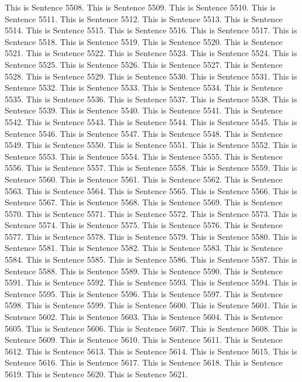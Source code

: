 \documentclass{article}
\begin{document}
This is Sentence 5508.
This is Sentence 5509.
This is Sentence 5510.
This is Sentence 5511.
This is Sentence 5512.
This is Sentence 5513.
This is Sentence 5514.
This is Sentence 5515.
This is Sentence 5516.
This is Sentence 5517.
This is Sentence 5518.
This is Sentence 5519.
This is Sentence 5520.
This is Sentence 5521.
This is Sentence 5522.
This is Sentence 5523.
This is Sentence 5524.
This is Sentence 5525.
This is Sentence 5526.
This is Sentence 5527.
This is Sentence 5528.
This is Sentence 5529.
This is Sentence 5530.
This is Sentence 5531.
This is Sentence 5532.
This is Sentence 5533.
This is Sentence 5534.
This is Sentence 5535.
This is Sentence 5536.
This is Sentence 5537.
This is Sentence 5538.
This is Sentence 5539.
This is Sentence 5540.
This is Sentence 5541.
This is Sentence 5542.
This is Sentence 5543.
This is Sentence 5544.
This is Sentence 5545.
This is Sentence 5546.
This is Sentence 5547.
This is Sentence 5548.
This is Sentence 5549.
This is Sentence 5550.
This is Sentence 5551.
This is Sentence 5552.
This is Sentence 5553.
This is Sentence 5554.
This is Sentence 5555.
This is Sentence 5556.
This is Sentence 5557.
This is Sentence 5558.
This is Sentence 5559.
This is Sentence 5560.
This is Sentence 5561.
This is Sentence 5562.
This is Sentence 5563.
This is Sentence 5564.
This is Sentence 5565.
This is Sentence 5566.
This is Sentence 5567.
This is Sentence 5568.
This is Sentence 5569.
This is Sentence 5570.
This is Sentence 5571.
This is Sentence 5572.
This is Sentence 5573.
This is Sentence 5574.
This is Sentence 5575.
This is Sentence 5576.
This is Sentence 5577.
This is Sentence 5578.
This is Sentence 5579.
This is Sentence 5580.
This is Sentence 5581.
This is Sentence 5582.
This is Sentence 5583.
This is Sentence 5584.
This is Sentence 5585.
This is Sentence 5586.
This is Sentence 5587.
This is Sentence 5588.
This is Sentence 5589.
This is Sentence 5590.
This is Sentence 5591.
This is Sentence 5592.
This is Sentence 5593.
This is Sentence 5594.
This is Sentence 5595.
This is Sentence 5596.
This is Sentence 5597.
This is Sentence 5598.
This is Sentence 5599.
This is Sentence 5600.
This is Sentence 5601.
This is Sentence 5602.
This is Sentence 5603.
This is Sentence 5604.
This is Sentence 5605.
This is Sentence 5606.
This is Sentence 5607.
This is Sentence 5608.
This is Sentence 5609.
This is Sentence 5610.
This is Sentence 5611.
This is Sentence 5612.
This is Sentence 5613.
This is Sentence 5614.
This is Sentence 5615.
This is Sentence 5616.
This is Sentence 5617.
This is Sentence 5618.
This is Sentence 5619.
This is Sentence 5620.
This is Sentence 5621.
\end{document}
